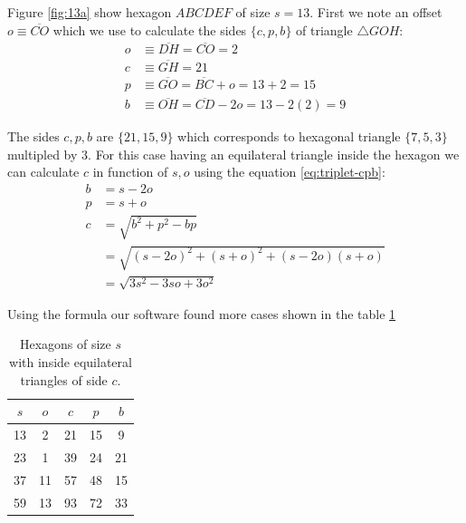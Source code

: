 \documentclass[11pt]{article}
\begin{document}
Figure \ref{fig:13a} show hexagon $ABCDEF$ of size $s = 13$. First we note an offset $o \equiv \overline{CO}$ which we use to calculate the sides $\{c,p,b\}$ of triangle $\triangle{GOH}$:
\begin{align}
o &\equiv \overline{DH} = \overline{CO} = 2 \nonumber\\
c &\equiv \overline{GH} = 21 \nonumber\\
p &\equiv \overline{GO} = \overline{BC} + o = 13+2 = 15 \nonumber\\
b &\equiv \overline{OH} = \overline{CD} - 2o = 13 - 2(2) = 9
\end{align}

The sides $c,p,b$ are $\{21,15,9\}$ which corresponds to hexagonal triangle $\{7,5,3\}$ multipled by $3$. For this case having an equilateral triangle inside the hexagon we can calculate $c$ in function of $s,o$ using the equation \ref{eq:triplet-cpb}:
\begin{align}
b &= s - 2o \nonumber\\
p &= s + o \nonumber\\
c &= \sqrt{b^2 + p^2 - bp} \nonumber\\
   &= \sqrt{(s - 2o)^2 + (s+o)^2 + (s - 2o)(s+o)} \nonumber\\
   &= \sqrt{3s^2 - 3so + 3o^2}
\end{align}

Using the formula our software found more cases shown in the table \ref{tbl:eqtriangles}
\begin{table}[H]
\begin{center}
\begin{tabular}{| c c | c c c |} 
 \hline
 $s$ & $o$ & $c$ & $p$ & $b$ \\ [0.5ex] 
 \hline\hline
  13 &  2 &  21 &  15 &  9 \\ \hline
  23 &  1 &  39 &  24 & 21 \\ \hline
  37 & 11 &  57 &  48 & 15 \\ \hline
  59 & 13 &  93 &  72 & 33 \\ \hline
\end{tabular}
\caption{Hexagons of size $s$ with inside equilateral triangles of side $c$.}
\label{tbl:eqtriangles}
\end{center}
\end{table}
\end{document}
